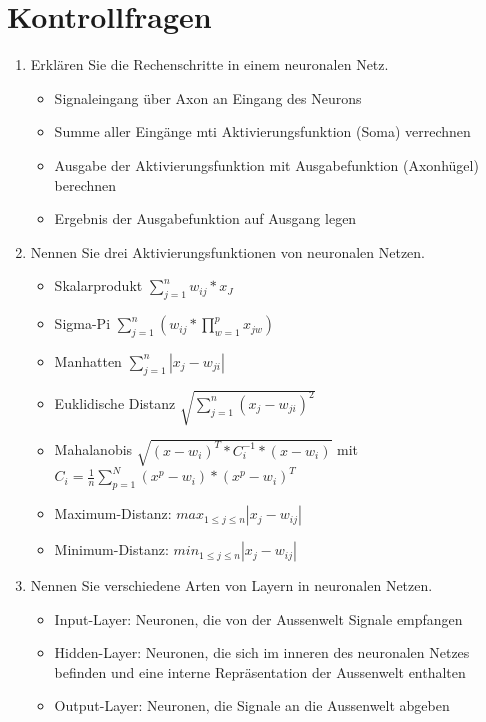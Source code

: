 \documentclass[a4paper,12pt,titlepage]{scrartcl}
\begin{document}
\section{Kontrollfragen}
\begin{enumerate}
    \item Erklären Sie die Rechenschritte in einem neuronalen Netz.
          \begin{itemize}
              \item Signaleingang über Axon an Eingang des Neurons
              \item Summe aller Eingänge mti Aktivierungsfunktion (Soma) verrechnen
              \item Ausgabe der Aktivierungsfunktion mit Ausgabefunktion (Axonhügel) berechnen
              \item Ergebnis der Ausgabefunktion auf Ausgang legen 
          \end{itemize}
    \item Nennen Sie drei Aktivierungsfunktionen von neuronalen Netzen.
          \begin{itemize}
              \item Skalarprodukt $\sum_{j=1}^n w_{ij} * x_J$
              \item Sigma-Pi $\sum_{j=1}^n (w_{ij} * \prod_{w=1}^p x_{jw})$
              \item Manhatten $\sum_{j=1}^n |x_j-w_{ji}|$
              \item Euklidische Distanz $\sqrt{\sum_{j=1}^n (x_j-w_{ji})^2}$
              \item Mahalanobis $\sqrt{(x-w_i)^T *C_i^{-1} * (x-w_i)}$ mit $C_i=\frac{1}{n} \sum_{p=1}^N (x^p-w_i)*(x^p-w_i)^T$
              \item Maximum-Distanz: $max_{1\leq j\leq n} |x_j-w_{ij}|$
              \item Minimum-Distanz: $min_{1\leq j\leq n} |x_j-w_{ij}|$
          \end{itemize}
    \item Nennen Sie verschiedene Arten von Layern in neuronalen Netzen.
          \begin{itemize}
              \item Input-Layer: Neuronen, die von der Aussenwelt Signale empfangen
              \item Hidden-Layer: Neuronen, die sich im inneren des neuronalen Netzes befinden und eine interne Repräsentation der Aussenwelt enthalten
              \item Output-Layer: Neuronen, die Signale an die Aussenwelt abgeben

\end{itemize}
\end{enumerate}
\end{document}
